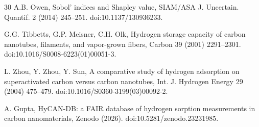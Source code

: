 \documentclass[preprint,12pt]{elsarticle}
\begin{document}
\begin{thebibliography}{30}
 A.B. Owen, Sobol' indices and Shapley value, SIAM/ASA J.
Uncertain. Quantif. 2 (2014) 245--251. doi:10.1137/130936233.

 G.G. Tibbetts, G.P. Meisner, C.H. Olk, Hydrogen
storage capacity of carbon nanotubes, filaments, and vapor-grown fibers,
Carbon 39 (2001) 2291--2301. doi:10.1016/S0008-6223(01)00051-3.

 L. Zhou, Y. Zhou, Y. Sun, A comparative study of
hydrogen adsorption on superactivated carbon versus carbon nanotubes, Int.
J. Hydrogen Energy 29 (2004) 475--479. doi:10.1016/S0360-3199(03)00092-2.

 A. Gupta, HyCAN-DB: a FAIR database of hydrogen sorption
measurements in carbon nanomaterials, Zenodo (2026).
doi:10.5281/zenodo.23231985.

\end{thebibliography}
\end{document}

